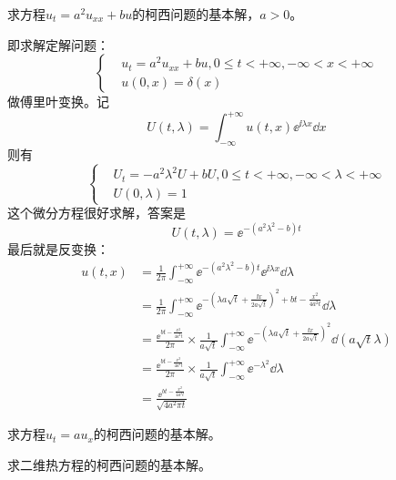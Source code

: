 \begin{problembox}
    \begin{example}
        求方程$u_t = a^2 u_{xx} + bu$的柯西问题的基本解，$a>0$。
    \end{example}
    \begin{solution}
        即求解定解问题：
        \begin{equation*}
            \left\{
                \begin{aligned}
                    &u_t = a^2 u_{xx} + b u, 0 \leq t < +\infty, -\infty < x < +\infty\\
                    &u(0, x) = \delta(x)
                \end{aligned}
            \right.
        \end{equation*}
    做傅里叶变换。记
    \[U(t, \lambda) = \int_{-\infty}^{+\infty} u(t, x) \ee^{\ii \lambda x} \dd{x}\]
    则有
    \begin{equation*}
        \left\{
            \begin{aligned}
                &U_t = - a^2 \lambda^2 U + b U, 0 \leq t < +\infty, -\infty < \lambda < +\infty\\
                &U(0, \lambda) = 1
            \end{aligned}
        \right.
    \end{equation*}
    这个微分方程很好求解，答案是
    \[U(t, \lambda) = \ee^{-\left(a^2 \lambda^2 - b\right)t}\]
    最后就是反变换：
    \begin{align*}
        u(t, x) &= \frac{1}{2 \pi} \int_{-\infty}^{+\infty} \ee^{-\left(a^2 \lambda^2 - b\right)t} \ee^{\ii \lambda x} \dd{\lambda}\\
        &= \frac{1}{2 \pi } \int_{-\infty}^{+\infty} \ee^{-\left(\lambda a \sqrt{t} + \frac{\ii x}{2 a \sqrt{t}}\right)^2 + b t - \frac{x^2}{4 a^2 t}} \dd{\lambda}\\
        &= \frac{\ee^{b t - \frac{x^2}{4 a^2 t}}}{2 \pi} \times \frac{1}{a\sqrt{t}} \int_{-\infty}^{+\infty} \ee^{-\left(\lambda a \sqrt{t} + \frac{\ii x}{2 a \sqrt{t}}\right)^2} \dd{\left(a \sqrt{t} \lambda\right)}\\
        &= \frac{\ee^{b t - \frac{x^2}{4 a^2 t}}}{2 \pi} \times \frac{1}{a\sqrt{t}} \int_{-\infty}^{+\infty} \ee^{-\lambda^2} \dd{\lambda}\\
        &= \frac{\ee^{b t - \frac{x^2}{4 a^2 t}}}{\sqrt{4 a^2 \pi t}}
    \end{align*}
    \end{solution}
\end{problembox}
\begin{problembox}
    \begin{exercise}
        求方程$u_t = a u_x$的柯西问题的基本解。
    \end{exercise}
    \begin{exercise}
        求二维热方程的柯西问题的基本解。
    \end{exercise}
\end{problembox}

